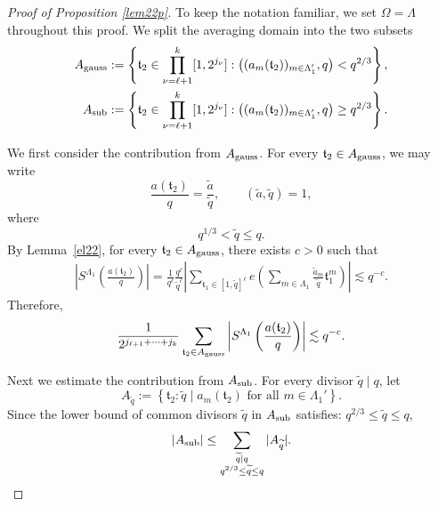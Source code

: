 \documentclass[11 pt,letterpaper]{amsart}
\theoremstyle{plain}
\theoremstyle{definition}
\theoremstyle{remark} \theoremstyle{exam} \theoremstyle{ob}
\numberwithin{equation}{section}
\begin{document}
 \begin{proof}[Proof of Proposition \ref{lem22p}] To keep the notation familiar, we set $\Omega=\Lambda$ throughout this proof.
	We split the averaging domain into the two subsets
	\begin{align*}
		A_{\rm gauss}
		&:=
		\left\{
		\mathfrak{t}_2\in
		\prod_{\nu=\ell+1}^k[1,2^{j_\nu}]
		:
		\bigl((a_m(\mathfrak{t}_2))_{m\in\Lambda_1'},q\bigr)
		<
		q^{2/3}
		\right\},\\
		A_{\rm sub}
		&:=
		\left\{
		\mathfrak{t}_2\in
		\prod_{\nu=\ell+1}^k[1,2^{j_\nu}]
		:
		\bigl((a_m(\mathfrak{t}_2))_{m\in\Lambda_1'},q\bigr)
		\ge
		q^{2/3}
		\right\}.
	\end{align*}
	
	We first consider the contribution from $A_{\rm gauss}$.
	For every $\mathfrak t_2\in A_{\rm gauss}$, we may write
	\[
	\frac{a(\mathfrak t_2)}{q}
	=
	\frac{\widetilde a}{\widetilde q},
	\qquad
	(\widetilde a,\widetilde q)=1,
	\]
	where
	\[
	q^{1/3}< \widetilde q\le q.
	\]
By	 Lemma~\ref{el22}, for every $\mathfrak t_2\in A_{\rm gauss}$, there exists $c>0$ such that
	\begin{align*}
		\left|
		S^{\Lambda_1}
		\left(
		\frac{a(\mathfrak t_2)}{q}
		\right)
		\right|
		=
		\frac1{q^\ell}
		\frac{q^\ell}{\widetilde q^\ell}
		\left|
		\sum_{\mathfrak t_1\in[1,\widetilde q]^\ell}
		e\!\left(
		\sum_{m\in\Lambda_1}
		\frac{\widetilde a_m}{\widetilde q}
		\mathfrak t_1^m
		\right)
		\right|   
		\lesssim q^{-c}.
	\end{align*}
	Therefore,
	\begin{align}\label{4040}
		\frac1{2^{j_{\ell+1}+\cdots+j_k}}
		\sum_{\mathfrak t_2\in A_{\rm gauss}}
		\left|
		S^{\Lambda_1}
		\left(
		\frac{a(\mathfrak t_2)}{q}
		\right)
		\right|
		\lesssim
	q^{-c}.
	\end{align}
	
	Next we estimate the contribution from $A_{\rm sub}$.
	For every divisor $\widetilde q\mid q$, let
	\[
	A_{\widetilde q}
	:=
	\left\{
	\mathfrak t_2:
	\widetilde q
	\mid
	a_m(\mathfrak t_2)
	\text{ for all }
	m\in\Lambda_1'
	\right\}.
	\]
	Since the lower bound of common divisors $\widetilde q$  in $ A_{\rm sub}$ satisfies:
	$q^{2/3}\le\widetilde q\le q$, 
	\[
	|A_{\rm sub}|
	\le
	\sum_{\substack{\widetilde q\mid q\\
			q^{2/3}\le\widetilde q\le q}}
	|A_{\widetilde q}|.
	\]
	

\end{proof}
\end{document}
